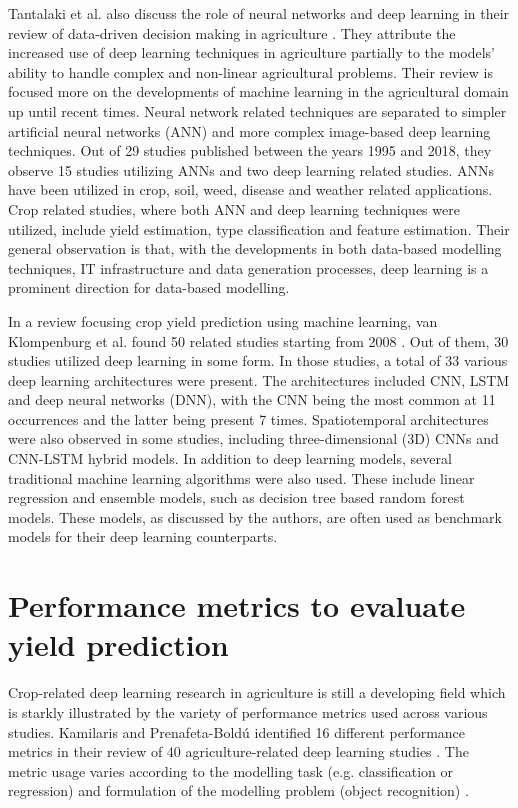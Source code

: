 Tantalaki et al. also discuss the role of neural networks and deep learning in their review of data-driven decision making in agriculture \cite{Tantalaki2019}. They attribute the increased use of deep learning techniques in agriculture partially to the models' ability to handle complex and non-linear agricultural problems. Their review is focused more on the developments of machine learning in the agricultural domain up until recent times. Neural network related techniques are separated to simpler artificial neural networks (ANN) and more complex image-based deep learning techniques. Out of 29 studies published between the years 1995 and 2018, they observe 15 studies utilizing ANNs and two deep learning related studies. ANNs have been utilized in crop, soil, weed, disease and weather related applications. Crop related studies, where both ANN and deep learning techniques were utilized, include yield estimation, type classification and feature estimation. Their general observation is that, with the developments in both data-based modelling techniques, IT infrastructure and data generation processes, deep learning is a prominent direction for data-based modelling. 

In a review focusing crop yield prediction using machine learning, van Klompenburg et al. found 50 related studies starting from 2008 \cite{VanKlompenburg2020}. Out of them, 30 studies utilized deep learning in some form. In those studies, a total of 33 various deep learning architectures were present. The architectures included CNN, LSTM and deep neural networks (DNN), with the CNN being the most common at 11 occurrences and the latter being present 7 times. Spatiotemporal architectures were also observed in some studies, including three-dimensional (3D) CNNs and CNN-LSTM hybrid models. In addition to deep learning models, several traditional machine learning algorithms were also used. These include linear regression and ensemble models, such as decision tree based random forest models. These models, as discussed by the authors, are often used as benchmark models for their deep learning counterparts.

\section{Performance metrics to evaluate yield prediction}
\label{sec:notes-on-metrics}

Crop-related deep learning research in agriculture is still a developing field which is starkly illustrated by the variety of performance metrics used across various studies. Kamilaris and Prenafeta-Bold{\'{u}} identified 16 different performance metrics in their review of 40 agriculture-related deep learning studies \cite{Kamilaris2018a}. The metric usage varies according to the modelling task (e.g. classification or regression) and formulation of the modelling problem (object recognition) \cite{Kamilaris2018b}.

